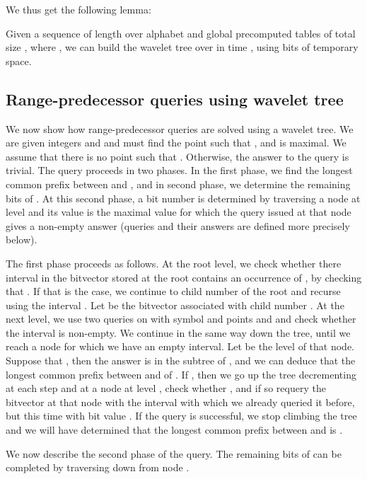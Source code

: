 \documentclass[11pt,runningheads]{llncs}
\begin{document}
{We thus get the following lemma: 

\begin{lemma}
\label{lemma:wavelet_tree_build}
Given a sequence  of length  over alphabet  
and global precomputed tables of total size , where , we can build the wavelet tree
over  in time , 
using  bits of temporary space. 
\end{lemma}

\subsection{Range-predecessor queries using wavelet tree} 

We now show how range-predecessor queries are solved using a wavelet tree. 
We are given integers  and  and must find the point 
such that ,  and  is maximal. 
We assume that there is no point  such that . 
Otherwise, the answer to the query is trivial. 
The query proceeds in two phases. In the first phase, we find the longest 
common prefix between  and , and in second phase, we determine the 
remaining bits of . At this second phase, a bit number  is determined 
by traversing a node at level  and its value is the maximal value
for which the query issued at that node gives a non-empty answer 
(queries and their answers are defined more precisely below). 

The first phase proceeds as follows. At the root level, we 
check whether there interval  in the bitvector  stored at the root 
contains an occurrence of , 
by checking that . 
If that is the case, we continue to child number  of the root 
and recurse using the interval . 
Let  be the bitvector associated with child number . 
At the next level, we use two  queries on  with symbol  and
points  and  and check whether 
the interval  is non-empty. 
We continue in the same way down the tree, until we reach a node  for which we have an empty 
interval. Let  be the level of that node. Suppose that , then the answer is in the subtree 
of , and we can deduce that the longest common prefix between  and 
of . If , then we go up the tree decrementing  at each step and at a node  at level , check whether , and if so requery the bitvector at that node with the interval with 
which we already queried it before, but this time with bit 
value . If the query is successful, we stop climbing the tree and we will have determined that the longest 
common prefix between  and  is . 

We now describe the second phase of the query. 
The remaining  bits of  can be completed by traversing down from node . 

}
\end{document}
